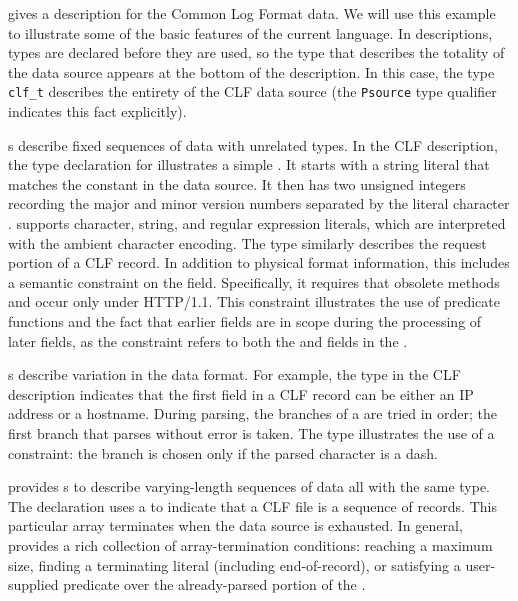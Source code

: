 \documentclass{sigplanconf}
\begin{document}
 gives a \pads{} description for the Common Log Format
data.  
We will use this example to illustrate some of the basic
features of the current \pads{} language.  
In \pads{} descriptions, types are declared before they are used, 
so the type that describes the totality of the data source appears 
at the bottom of the description.  
In this case,
the type \texttt{clf\_t}  describes the entirety of the
CLF data source (the \texttt{Psource} type qualifier indicates
this fact explicitly).  

s describe fixed sequences of data with unrelated types.
In the CLF description, the type declaration for
 illustrates a simple . It starts with a 
string literal that matches the constant  in the data source.  It 
then has two unsigned integers recording the major and minor version numbers
separated by the literal character .  \pads{} supports character, string,
and regular expression literals, which are interpreted with the ambient character 
encoding. The type  
similarly describes the request portion of a CLF record.  In addition
to physical format information, this  includes a semantic constraint
on the  field.  Specifically, it requires that obsolete methods
 and  occur only under HTTP/1.1.  This constraint illustrates
the use of predicate functions and the fact 
that earlier fields are in scope during the processing of later fields, as the 
constraint
refers to both the  and  fields in the .

s describe variation in the data format.  For example, the
 type in the CLF description indicates that the first
field in a CLF record can be either an IP address or a hostname.
During parsing, the branches of a  are tried in order; the
first branch that parses without error is taken.  The 
type illustrates the use of a constraint: the branch 
is chosen only if the parsed character is a dash.  

\pads{} provides s to describe varying-length sequences of
data all with the same type.  The  declaration  uses a
 to indicate that a CLF file is a sequence of 
records.  This particular array terminates when the data source is
exhausted. In general, \pads{} provides a rich
collection of array-termination conditions: reaching a maximum size,
finding a terminating literal (including end-of-record), or satisfying a
user-supplied predicate over the already-parsed portion of the . 
\end{document}
